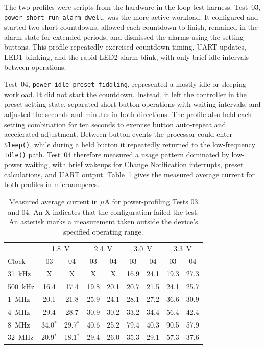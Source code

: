 \documentclass[11pt]{article}
\newcommand{\code}[1]{\texttt{#1}}
\begin{document}
The two profiles were scripts from the hardware-in-the-loop test harness. Test~03, \code{power\_short\_run\_alarm\_dwell}, was the more active workload. It configured and started two short countdowns, allowed each countdown to finish, remained in the alarm state for extended periods, and dismissed the alarms using the setting buttons. This profile repeatedly exercised countdown timing, UART updates, LED1 blinking, and the rapid LED2 alarm blink, with only brief idle intervals between operations.

Test~04, \code{power\_idle\_preset\_fiddling}, represented a mostly idle or sleeping workload. It did not start the countdown. Instead, it left the controller in the preset-setting state, separated short button operations with waiting intervals, and adjusted the seconds and minutes in both directions. The profile also held each setting combination for ten seconds to exercise button auto-repeat and accelerated adjustment. Between button events the processor could enter \code{Sleep()}, while during a held button it repeatedly returned to the low-frequency \code{Idle()} path. Test~04 therefore measured a usage pattern dominated by low-power waiting, with brief wakeups for Change Notification interrupts, preset calculations, and UART output. Table~\ref{tab:power-results} gives the measured average current for both profiles in microamperes.

\begin{table}[htbp]
\centering
\small
\setlength{\tabcolsep}{4pt}
\begin{tabular}{l*{8}{c}}
\hline
& \multicolumn{2}{c}{1.8~V} & \multicolumn{2}{c}{2.4~V} & \multicolumn{2}{c}{3.0~V} & \multicolumn{2}{c}{3.3~V} \\
Clock & 03 & 04 & 03 & 04 & 03 & 04 & 03 & 04 \\
\hline
31~kHz  & X           & X           & X    & X    & 16.9 & 24.1 & 19.3 & 27.3 \\
500~kHz & 16.4        & 17.4        & 19.8 & 20.1 & 20.7 & 21.5 & 24.1 & 25.7 \\
1~MHz   & 20.1        & 21.8        & 25.9 & 24.1 & 28.1 & 27.2 & 36.6 & 30.9 \\
4~MHz   & 29.4        & 28.7        & 30.9 & 30.2 & 33.2 & 34.4 & 56.4 & 42.4 \\
8~MHz   & 34.0$^{*}$  & 29.7$^{*}$  & 40.6 & 25.2 & 79.4 & 40.3 & 90.5 & 57.9 \\
32~MHz  & 20.9$^{*}$  & 18.1$^{*}$  & 29.4 & 26.0 & 35.3 & 29.1 & 57.3 & 37.6 \\
\hline
\end{tabular}
\caption{Measured average current in $\mu$A for power-profiling Tests 03 and 04. An X indicates that the configuration failed the test. An asterisk marks a measurement taken outside the device's specified operating range.}
\label{tab:power-results}
\end{table}
\end{document}

